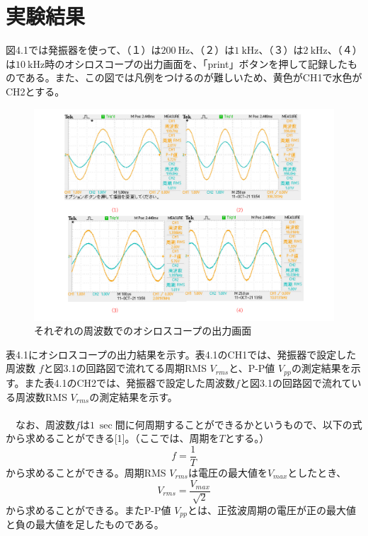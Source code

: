 \documentclass[12pt,a4paper]{jsarticle}
\numberwithin{equation}{section}
\numberwithin{figure}{section}
\numberwithin{table}{section}
\begin{document}
\newpage
\section{実験結果}
図4.1では発振器を使って、（１）は$\SI{200}{\hertz}$、（２）は$\SI{1}{\kilo\hertz}$、（３）は$\SI{2}{\kilo\hertz}$、（４）は$\SI{10}{\kilo\hertz}$時のオシロスコープの出力画面を、「print」ボタンを押して記録したものである。また、この図では凡例をつけるのが難しいため、黄色がCH1で水色がCH2とする。
\begin{figure}[H]
	\includegraphics[keepaspectratio,scale=0.5]{Chapter11_osc_result.pdf}
	\caption{それぞれの周波数でのオシロスコープの出力画面}
\end{figure}

\newpage
表4.1にオシロスコープの出力結果を示す。表4.1のCH1では、発振器で設定した周波数 $f$と図3.1の回路図で流れてる周期RMS $V_{rms}$と、P-P値 $V_{pp}$の測定結果を示す。また表4.1のCH2では、発振器で設定した周波数$f$と図3.1の回路図で流れている周波数RMS $V_{rms}$の測定結果を示す。
\\\\
　なお、周波数$f$は$\SI{1}{\sec}$間に何周期することができるかというもので、以下の式から求めることができる[1]。（ここでは、周期を$T$とする。）
\begin{equation}
	f=\dfrac{1}{T}
\end{equation}
から求めることができる。周期RMS $V_{rms}$は電圧の最大値を$V_{max}$としたとき、
\begin{equation}
	V_{rms}=\dfrac{V_{max}}{\sqrt{2}}
\end{equation}
から求めることができる。またP-P値 $V_{pp}$とは、正弦波周期の電圧が正の最大値と負の最大値を足したものである。
\end{document}
